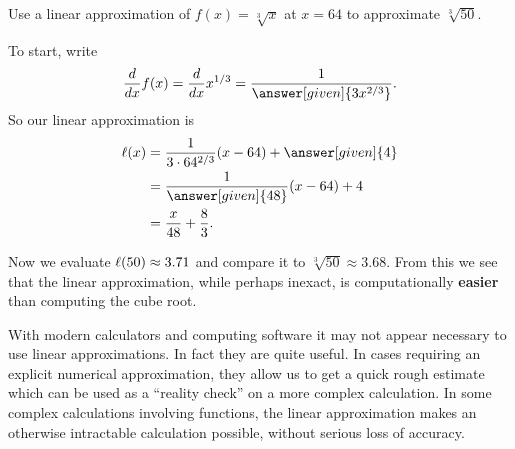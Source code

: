 \documentclass{ximera}
\begin{document}
\begin{example}
Use a linear approximation of $f(x) =\sqrt[3]{x}$ at $x=64$ to
approximate $\sqrt[3]{50}$.
\begin{explanation}
To start, write
\[
\ddx f(x) = \ddx x^{1/3} = \frac{1}{\answer[given]{3x^{2/3}}}.
\]
So our linear approximation is
\begin{align*}
\l(x) &= \frac{1}{3\cdot 64^{2/3}} (x-64) + \answer[given]{4} \\
&= \frac{1}{\answer[given]{48}} (x-64) + 4\\
&= \frac{x}{48} +\frac{8}{3}.
\end{align*}
\begin{image}
\end{image}
Now we evaluate $\ell(50) \approx 3.71$ and compare it to
$\sqrt[3]{50}\approx 3.68$.  From this we see that the linear
approximation, while perhaps inexact, is computationally \textbf{easier}
than computing the cube root.
\end{explanation}
\end{example}


With modern calculators and computing software it may not appear
necessary to use linear approximations. In fact they are quite
useful. In cases requiring an explicit numerical approximation, they
allow us to get a quick rough estimate which can be used as a
``reality check'' on a more complex calculation. In some complex
calculations involving functions, the linear approximation makes an
otherwise intractable calculation possible, without serious loss of
accuracy.
\end{document}

